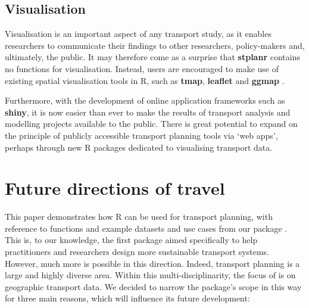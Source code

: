 \subsection{Visualisation}\label{visualisation}

Visualisation is an important aspect of any transport study, as it
enables researchers to communicate their findings to other researchers,
policy-makers and, ultimately, the public. It may therefore come as a
surprise that \textbf{stplanr} contains no functions for visualisation.
Instead, users are encouraged to make use of existing spatial
visualisation tools in R, such as \textbf{tmap}, \textbf{leaflet} and
\textbf{ggmap} \citep{cheshire_spatial_2015,kahle_ggmap:_2013}.

Furthermore, with the development of online application frameworks such
as \textbf{shiny}, it is now easier than ever to make the results of
transport analysis and modelling projects available to the public.
There is great potential to expand on
the principle of publicly accessible transport planning tools via `web
apps', perhaps through new R packages dedicated to visualising transport
data.

\section{Future directions of travel}\label{future-directions-of-travel}

This paper demonstrates how R can be used for transport planning, with reference to functions and example datasets and use cases from our package .
This is, to our knowledge, the first package aimed specifically to help practitioners and researchers design more sustainable transport systems.
However, much more is possible in this direction.
Indeed, transport planning is a large and highly diverse area.
Within this multi-disciplinarity, the focus of  is on geographic transport data.
We decided to narrow the package's scope in this way for three main reasons, which will influence its future development:

